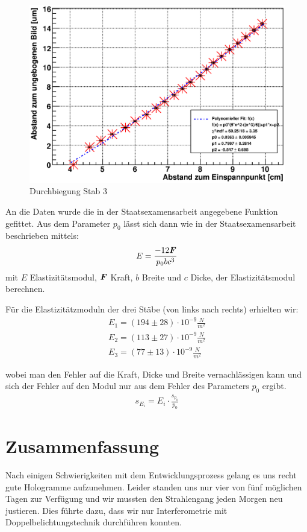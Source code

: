 \documentclass[12pt]{article}
\renewcommand*\vec[1]{{\mbox{\boldmath\ensuremath{#1}}}}
\begin{document}
\begin{figure}[H]
\centering
 \includegraphics[width=0.9\linewidth]{pictures/st3.eps}
 \caption{Durchbiegung Stab 3}
\end{figure}

An die Daten wurde die in der Staatsexamensarbeit angegebene Funktion gefittet. Aus dem Parameter $p_0$ lässt sich dann wie in der Staatsexamensarbeit
beschrieben mittels:
\begin{align*}
 E = \frac{-12 \vec F}{p_0 b c^3}
\end{align*}
mit $E$ Elastizitätsmodul, $\vec F$ Kraft, $b$ Breite und $c$ Dicke, der Elastizitätsmodul berechnen.

Für die Elastizitätzmoduln der drei Stäbe (von links nach rechts) erhielten wir:
\begin{align*}
 E_1 =(194 \pm 28) \cdot 10^{-9} \frac{N}{m^2}\\
 E_2 =(113 \pm 27) \cdot 10^{-9} \frac{N}{m^2}\\
 E_3 =(77  \pm 13) \cdot 10^{-9} \frac{N}{m^2}
\end{align*}

wobei man den Fehler auf die Kraft, Dicke und Breite vernachlässigen kann und sich der Fehler auf den Modul nur aus dem Fehler des Parameters $p_0$ ergibt.
\begin{align}
 s_{E_i} = E_i \cdot \frac{s_{p_0}}{p_0}
\end{align}



\section{Zusammenfassung}
Nach einigen Schwierigkeiten mit dem Entwicklungsprozess gelang es uns recht gute Hologramme aufzunehmen. Leider standen uns nur vier von fünf möglichen Tagen
zur Verfügung und wir mussten den Strahlengang jeden Morgen neu justieren. Dies führte dazu, dass wir nur Interferometrie mit Doppelbelichtungstechnik durchführen konnten.
 
\end{document}
